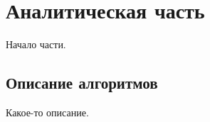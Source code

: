 \chapter{Аналитическая часть}
\label{cha:analysis}

Начало части.

\section{Описание алгоритмов}

Какое-то описание.
